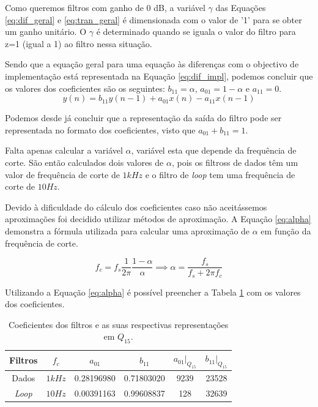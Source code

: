 \documentclass[11pt]{article}
\numberwithin{equation}{section}
\begin{document}
	Como queremos filtros com ganho de 0 dB, a variável $ \gamma $ das Equações \ref{eq:dif_geral} e \ref{eq:tran_geral} é dimensionada com o valor de '1' para se obter um ganho unitário. O $ \gamma $ é determinado quando se iguala o valor do filtro para z=1 (igual a 1) ao filtro nessa situação.
	
	Sendo que a equação geral para uma equação às diferenças com o objectivo de implementação está representada na Equação \ref{eq:dif_impl}, podemos concluir que os valores dos coeficientes são os seguintes: $ b_{11}=\alpha $, $ a_{01}=1-\alpha $ e $ a_{11}=0 $.
	\begin{equation}
	y(n)=b_{11} y(n-1) + a_{01}x(n)-a_{11}x(n-1)
	\label{eq:dif_impl}
	\end{equation}
	
	Podemos desde já concluir que a representação da saída do filtro pode ser representada no formato dos coeficientes, visto que $ a_{01}+b_{11}=1 $.
	
	Falta apenas calcular a variável $ \alpha $, variável esta que depende da frequência de corte. São então calculados dois valores de $ \alpha $, pois os filtross de dados têm um valor de frequência de corte de $ 1kHz $ e o filtro de \textit{loop} tem uma frequência de corte de $ 10Hz $.
	
	Devido à dificuldade do cálculo dos coeficientes caso não aceitássemos aproximações foi decidido utilizar métodos de aproximação. A Equação \ref{eq:alpha} demonstra a fórmula utilizada para calcular uma aproximação de $ \alpha $ em função da frequência de corte.
	
	\begin{equation}
	f_{c}=f_{s}\frac{1}{2 \pi}\frac{1-\alpha}{\alpha} \implies \alpha=\frac{f_{s}}{f_{s} + 2 \pi f_{c}}
	\label{eq:alpha}
	\end{equation}
	
	Utilizando a Equação \ref{eq:alpha} é possível preencher a Tabela \ref{tab:filter_coef} com os valores dos coeficientes.
	
	\begin{table}[H]
		\centering
		\begin{tabular}{|c|c|c|c|c|c|}
			\hline Filtros & $ f_{c} $ & $ a_{01} $ &  $ b_{11} $ & $ a_{01}|_{Q_{15}} $& $ b_{11}|_{Q_{15}} $ \\ 
			\hline
			\hline Dados & $ 1kHz $ & 0.28196980 & 0.71803020 & 9239 & 23528 \\ 
			\hline \textit{Loop} & $ 10Hz $ & 0.00391163 & 0.99608837 & 128 & 32639 \\ 
			\hline
		\end{tabular}
		\caption{Coeficientes dos filtros e as suas respectivas representações em $ Q_{15} $.}
		\label{tab:filter_coef} 
	\end{table}
	
\end{document}
